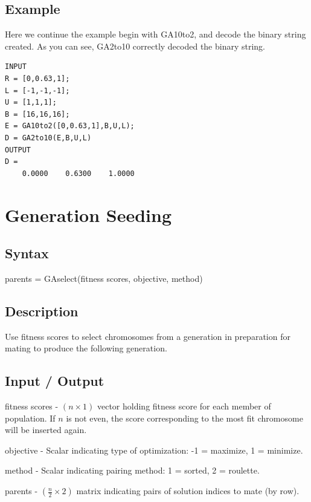 \documentclass{book}
\newcommand{\textcode}[1]{\textsf{\small #1}}   %
\begin{document}
\subsection*{Example}

Here we continue the example begin with \textcode{GA10to2}, and
decode the binary string created. As you can see,
\textcode{GA2to10} correctly decoded the binary string.
\begin{verbatim}
INPUT
R = [0,0.63,1];
L = [-1,-1,-1];
U = [1,1,1];
B = [16,16,16];
E = GA10to2([0,0.63,1],B,U,L);
D = GA2to10(E,B,U,L)
OUTPUT
D =
    0.0000    0.6300    1.0000
\end{verbatim}

\section{Generation Seeding}

\subsection*{Syntax}

\textcode{parents = GAselect(fitness scores, objective,
method)}

\subsection*{Description}

Use fitness scores to select chromosomes from a generation in preparation
for mating to produce the following generation.

\subsection*{Input / Output}

\begin{compactitem}

\item \textcode{fitness scores} - $\left( n \times 1 \right)$ vector holding fitness score for each member of population. If $n$ is not even, the score corresponding to the most fit chromosome will be inserted again.

\item \textcode{objective} - Scalar indicating type of optimization: -1 =  maximize, 1 =  minimize.

\item \textcode{method} - Scalar indicating pairing method: 1 =  sorted, 2 =  roulette.

\item \textcode{parents} - $\left( \frac{n}{2} \times 2 \right)$ matrix indicating pairs of solution indices to
mate (by row).

\end{compactitem}
\end{document}
